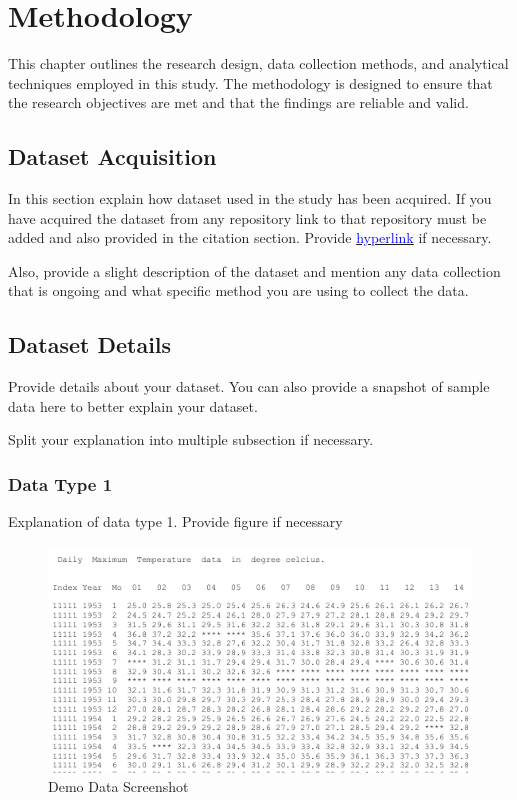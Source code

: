 \chapter{Methodology}\label{methodology}

This chapter outlines the research design, data collection methods, and analytical techniques employed in this study. The methodology is designed to ensure that the research objectives are met and that the findings are reliable and valid.


\section{Dataset Acquisition}

In this section explain how dataset used in the study has been acquired. If you have acquired the dataset from any repository link to that repository must be added and also provided in the citation section. Provide \href{https://example.com/record/2000}{\textcolor{blue}{hyperlink}} if necessary. 

Also, provide a slight description of the dataset and mention any data collection that is ongoing and what specific method you are using to collect the data.


\section{Dataset Details}

Provide details about your dataset. You can also provide a snapshot of sample data here to better explain your dataset.

Split your explanation into multiple subsection if necessary.


\subsection{Data Type 1}

Explanation of data type 1. Provide figure if necessary

\begin{figure}[htb ]
    \centering
    \includegraphics[width=.75\textwidth]{figures/demoFigure2.png}
    \caption{Demo Data Screenshot}
    \label{fig:dataDemo}
\end{figure}

